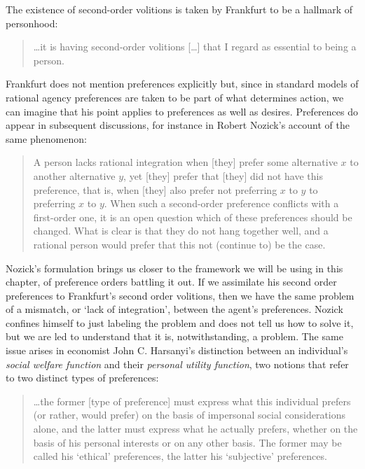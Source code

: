 The existence of second-order volitions is taken by Frankfurt 
to be a hallmark of personhood:

\begin{quote}
	\dots it is having second-order volitions [\dots] 
	that I regard as essential to being a person.
	\cite{Frankfurt88}
\end{quote}

Frankfurt does not mention preferences explicitly but, 
since in standard models of rational agency
preferences are taken to be part of what determines action, 
we can imagine that his point applies to preferences as well as desires.
Preferences do appear in subsequent discussions, for instance
in Robert Nozick's account of the same phenomenon:

\begin{quote}
	A person lacks rational integration when [they] prefer some alternative $x$ 
	to another alternative $y$, yet [they] prefer that [they] 
	did not have this preference, 
	that is, when [they] also prefer not preferring $x$ to $y$ 
	to preferring $x$ to $y$. 
	When such a second-order preference conflicts with a first-order one, 
	it is an open question which of these preferences should be changed. 
	What is clear is that they do not hang together well, 
	and a rational person would prefer that this not (continue to) be the case.
	\cite{Nozick94}
\end{quote}

Nozick's formulation brings us closer to the framework 
we will be using in this chapter, of preference orders battling it out.
If we assimilate his second order preferences to Frankfurt's second 
order volitions, then we have the same problem of a mismatch, 
or `lack of integration',
between the agent's preferences.
Nozick confines himself to just labeling the problem and does not tell 
us how to solve it, but we are led to understand that it is,
notwithstanding, a problem.
The same issue arises in economist John C. Harsanyi's
distinction between an individual's 
\emph{social welfare function} and their \emph{personal utility function},
two notions that refer to two distinct types of preferences:

\begin{quote}
	\dots the former [type of preference] 
	must express what this individual prefers 
	(or rather, would prefer) on the basis of 
	impersonal social considerations alone, 
	and the latter must express what he actually prefers, 
	whether on the basis of his personal 
	interests or on any other basis. 
	The former may be called his `ethical' preferences, 
	the latter his `subjective' preferences.
	\cite{Harsanyi55}
\end{quote}

